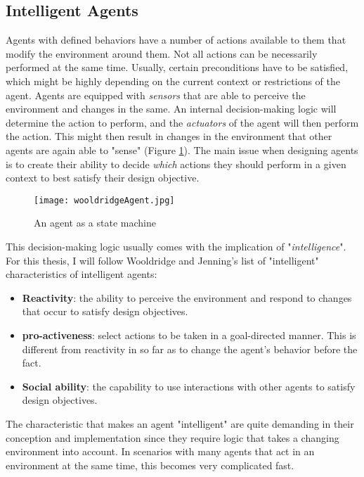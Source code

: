 \subsection{Intelligent Agents}
Agents with defined behaviors have a number of actions available to them that modify the environment around them. Not all actions can be necessarily performed at the same time. Usually, certain preconditions have to be satisfied, which might be highly depending on the current context or restrictions of the agent. Agents are equipped with \textit{sensors} that are able to perceive the environment and changes in the same. An internal decision-making logic will determine the action to perform, and the \textit{actuators} of the agent will then perform the action. This might then result in changes in the environment that other agents are again able to "sense" (Figure \ref{fig:wooldridgeAgent}). The main issue when designing agents is to create their ability to decide \textit{which} actions they should perform in a given context to best satisfy their design objective.~\cite{Wooldridge2009}\\
\begin{figure}
	\centering
	\texttt{[image: wooldridgeAgent.jpg]}
	\caption{An agent as a state machine~\cite{Wooldridge2009}}
	\label{fig:wooldridgeAgent}
\end{figure}
This decision-making logic usually comes with the implication of "\textit{intelligence}". For this thesis, I will follow Wooldridge and Jenning's list of "intelligent" characteristics of intelligent agents:
\begin{itemize}
	\item \textbf{Reactivity}: the ability to perceive the environment and respond to changes that occur to satisfy design objectives.
	\item \textbf{pro-activeness}: select actions to be taken in a goal-directed manner. This is different from reactivity in so far as to change the agent's behavior before the fact.
	\item \textbf{Social ability}: the capability to use interactions with other agents to satisfy design objectives.
\end{itemize}
The characteristic that makes an agent "intelligent" are quite demanding in their conception and implementation since they require logic that takes a changing environment into account. In scenarios with many agents that act in an environment at the same time, this becomes very complicated fast.~\cite{Wooldridge1995}
